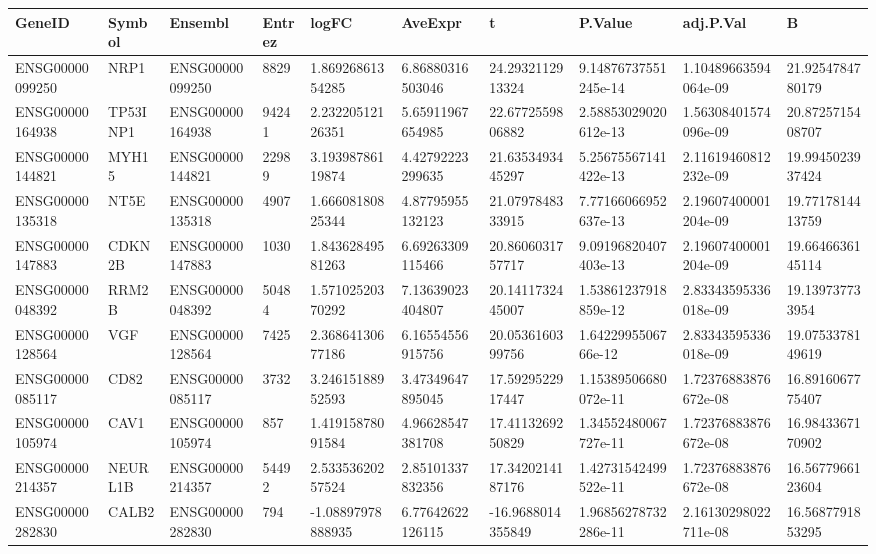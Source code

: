 \begingroup
\tiny
\setlength{\tabcolsep}{2pt}
\renewcommand{\arraystretch}{1.18}
\begin{tabular}{@{}llllllllll@{}}
\toprule
GeneID & Symbol & Ensembl & Entrez & logFC & AveExpr & t & P.Value & adj.P.Val & B \\
\midrule
ENSG00000099250 & NRP1 & ENSG00000099250 & 8829 & 1.86926861354285 & 6.86880316503046 & 24.2932112913324 & 9.14876737551245e-14 & 1.10489663594064e-09 & 21.9254784780179 \\
ENSG00000164938 & TP53INP1 & ENSG00000164938 & 94241 & 2.23220512126351 & 5.65911967654985 & 22.6772559806882 & 2.58853029020612e-13 & 1.56308401574096e-09 & 20.8725715408707 \\
ENSG00000144821 & MYH15 & ENSG00000144821 & 22989 & 3.19398786119874 & 4.42792223299635 & 21.6353493445297 & 5.25675567141422e-13 & 2.11619460812232e-09 & 19.9945023937424 \\
ENSG00000135318 & NT5E & ENSG00000135318 & 4907 & 1.66608180825344 & 4.87795955132123 & 21.0797848333915 & 7.77166066952637e-13 & 2.19607400001204e-09 & 19.7717814413759 \\
ENSG00000147883 & CDKN2B & ENSG00000147883 & 1030 & 1.84362849581263 & 6.69263309115466 & 20.8606031757717 & 9.09196820407403e-13 & 2.19607400001204e-09 & 19.6646636145114 \\
ENSG00000048392 & RRM2B & ENSG00000048392 & 50484 & 1.57102520370292 & 7.13639023404807 & 20.1411732445007 & 1.53861237918859e-12 & 2.83343595336018e-09 & 19.139737733954 \\
ENSG00000128564 & VGF & ENSG00000128564 & 7425 & 2.36864130677186 & 6.16554556915756 & 20.0536160399756 & 1.6422995506766e-12 & 2.83343595336018e-09 & 19.0753378149619 \\
ENSG00000085117 & CD82 & ENSG00000085117 & 3732 & 3.24615188952593 & 3.47349647895045 & 17.5929522917447 & 1.15389506680072e-11 & 1.72376883876672e-08 & 16.8916067775407 \\
ENSG00000105974 & CAV1 & ENSG00000105974 & 857 & 1.41915878091584 & 4.96628547381708 & 17.4113269250829 & 1.34552480067727e-11 & 1.72376883876672e-08 & 16.9843367170902 \\
ENSG00000214357 & NEURL1B & ENSG00000214357 & 54492 & 2.53353620257524 & 2.85101337832356 & 17.3420214187176 & 1.42731542499522e-11 & 1.72376883876672e-08 & 16.5677966123604 \\
ENSG00000282830 & CALB2 & ENSG00000282830 & 794 & -1.08897978888935 & 6.77642622126115 & -16.9688014355849 & 1.96856278732286e-11 & 2.16130298022711e-08 & 16.5687791853295 \\

\end{tabular}
